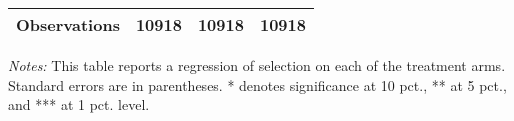 \begin{table}[htbp]
{\begin{threeparttable}
\begin{tabular}{l*{3}{c}}
Observations    &    10918         &    10918         &    10918         \\
\bottomrule \end{tabular} \begin{tablenotes}[flushleft] \footnotesize \item \emph{Notes:} This table reports a regression of selection on each of the treatment arms. Standard errors are in parentheses. * denotes significance at 10 pct., ** at 5 pct., and *** at 1 pct. level. \end{tablenotes} \end{threeparttable} } \end{table}

